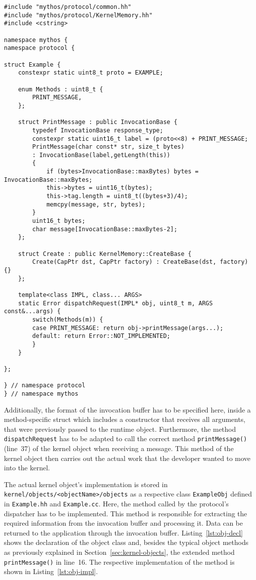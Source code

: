 \lstset{language=c++,caption=Object's Protocol Definition,label=lst:obj-protocol}
\begin{lstlisting}
#include "mythos/protocol/common.hh"
#include "mythos/protocol/KernelMemory.hh"
#include <cstring>

namespace mythos {
namespace protocol {

struct Example {
	constexpr static uint8_t proto = EXAMPLE;

	enum Methods : uint8_t {
		PRINT_MESSAGE,
	};

	struct PrintMessage : public InvocationBase {
		typedef InvocationBase response_type;
		constexpr static uint16_t label = (proto<<8) + PRINT_MESSAGE;
		PrintMessage(char const* str, size_t bytes)
		: InvocationBase(label,getLength(this))
		{
			if (bytes>InvocationBase::maxBytes) bytes = InvocationBase::maxBytes;
			this->bytes = uint16_t(bytes);
			this->tag.length = uint8_t((bytes+3)/4);
			memcpy(message, str, bytes);
		}
		uint16_t bytes;
		char message[InvocationBase::maxBytes-2];
	};

	struct Create : public KernelMemory::CreateBase {
		Create(CapPtr dst, CapPtr factory) : CreateBase(dst, factory) {}
	};

	template<class IMPL, class... ARGS>
	static Error dispatchRequest(IMPL* obj, uint8_t m, ARGS const&...args) {
		switch(Methods(m)) {
		case PRINT_MESSAGE: return obj->printMessage(args...);
		default: return Error::NOT_IMPLEMENTED;
		}
	}

};

} // namespace protocol
} // namespace mythos
\end{lstlisting}

Additionally, the format of the invocation buffer has to be specified here,
inside a method-specific struct which includes a constructor that receives all
arguments, that were previously passed to the runtime object.  Furthermore, the
method \texttt{dispatchRequest} has to be adapted to call the correct method
\texttt{printMessage()} (line~37) of the kernel object when receiving a message.
This method of the kernel object then carries out the actual work that the
developer wanted to move into the kernel.

The actual kernel object's implementation is stored in
\\\texttt{kernel/objects/<objectName>/objects} as a respective class
\texttt{ExampleObj} defined in \texttt{Example.hh} and \texttt{Example.cc}.
Here, the method called by the protocol's dispatcher has to be implemented. This
method is responsible for extracting the required information from the
invocation buffer and processing it. Data can be returned to the application
through the invocation buffer. Listing~\ref{lst:obj-decl} shows the declaration
of the object class and, besides the typical object methods as previously
explained in Section~\ref{sec:kernel-objects}, the extended method
\texttt{printMessage()} in line~16. The respective implementation of the method
is shown in Listing~\ref{lst:obj-impl}. \\

